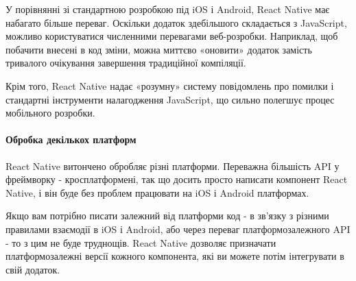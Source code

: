 У порівнянні зі стандартною розробкою під iOS і Android, React Native має набагато більше переваг. Оскільки додаток здебільшого складається з JavaScript, можливо користуватися численними перевагами веб-розробки. Наприклад, щоб побачити внесені в код зміни, можна миттєво «оновити» додаток замість тривалого очікування завершення традиційної компіляції. 

Крім того, React Native надає «розумну» систему повідомлень про помилки і стандартні інструменти налагодження JavaScript, що сильно полегшує процес мобільного розробки.

\paragraph{Обробка декількох платформ}

React Native витончено обробляє різні платформи. Переважна більшість API у фреймворку - кросплатформені, так що досить просто написати компонент React Native, і він буде без проблем працювати на iOS і Android платформах.

Якщо вам потрібно писати залежний від платформи код - в зв'язку з різними правилами взаємодії в iOS і Android, або через переваг платформозалежного API - то з цим не буде труднощів. React Native дозволяє призначати платформозалежні версії кожного компонента, які ви можете потім інтегрувати в свій додаток.

